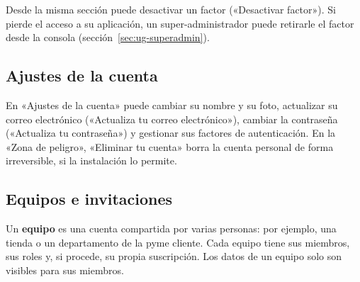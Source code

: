 Desde la misma sección puede desactivar un factor («Desactivar factor»). Si
pierde el acceso a su aplicación, un super-administrador puede retirarle el
factor desde la consola (sección~\ref{sec:ug-superadmin}).

\subsection{Ajustes de la cuenta}
\label{sec:ug-cuenta}

En «Ajustes de la cuenta» puede cambiar su nombre y su foto, actualizar su
correo electrónico («Actualiza tu correo electrónico»), cambiar la contraseña
(«Actualiza tu contraseña») y gestionar sus factores de autenticación. En la
«Zona de peligro», «Eliminar tu cuenta» borra la cuenta personal de forma
irreversible, si la instalación lo permite.

\subsection{Equipos e invitaciones}
\label{sec:ug-equipos}

Un \textbf{equipo} es una cuenta compartida por varias personas: por ejemplo,
una tienda o un departamento de la pyme cliente. Cada equipo tiene sus
miembros, sus roles y, si procede, su propia suscripción. Los datos de un
equipo solo son visibles para sus miembros.

